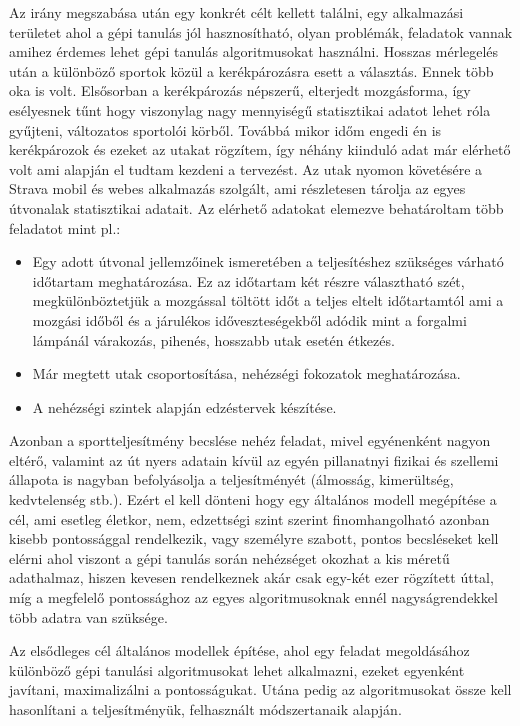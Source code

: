 Az irány megszabása után egy konkrét célt kellett találni, egy alkalmazási területet ahol a gépi tanulás jól hasznosítható, olyan problémák, feladatok vannak amihez érdemes lehet gépi tanulás algoritmusokat használni. Hosszas mérlegelés után a különböző sportok közül a kerékpározásra esett a választás. Ennek több oka is volt. Elsősorban a kerékpározás népszerű, elterjedt mozgásforma, így esélyesnek tűnt hogy viszonylag nagy mennyiségű statisztikai adatot lehet róla gyűjteni, változatos sportolói körből. Továbbá mikor időm engedi én is kerékpározok és ezeket az utakat rögzítem, így néhány kiinduló adat már elérhető volt ami alapján el tudtam kezdeni a tervezést. Az utak nyomon követésére a Strava mobil és webes alkalmazás szolgált, ami részletesen tárolja az egyes útvonalak statisztikai adatait. Az elérhető adatokat elemezve behatároltam több feladatot mint pl.:
\begin{itemize}
	\item Egy adott útvonal jellemzőinek ismeretében a teljesítéshez szükséges várható időtartam meghatározása. Ez az időtartam két részre választható szét, megkülönböztetjük a mozgással töltött időt a teljes eltelt időtartamtól ami a mozgási időből és a járulékos időveszteségekből adódik mint a forgalmi lámpánál várakozás, pihenés, hosszabb utak esetén étkezés.
	\item Már megtett utak csoportosítása, nehézségi fokozatok meghatározása.
	\item A nehézségi szintek alapján edzéstervek készítése.
\end{itemize}

Azonban a sportteljesítmény becslése nehéz feladat, mivel egyénenként nagyon eltérő, valamint az út nyers adatain kívül az egyén pillanatnyi fizikai és szellemi állapota is nagyban befolyásolja a teljesítményét (álmosság, kimerültség, kedvtelenség stb.). Ezért el kell dönteni hogy egy általános modell megépítése a cél, ami esetleg életkor, nem, edzettségi szint szerint finomhangolható azonban kisebb pontossággal rendelkezik, vagy személyre szabott, pontos becsléseket kell elérni ahol viszont a gépi tanulás során nehézséget okozhat a kis méretű adathalmaz, hiszen kevesen rendelkeznek akár csak egy-két ezer rögzített úttal, míg a megfelelő pontossághoz az egyes algoritmusoknak ennél nagyságrendekkel több adatra van szüksége.
 
Az elsődleges cél általános modellek építése, ahol egy feladat megoldásához különböző gépi tanulási algoritmusokat lehet alkalmazni, ezeket egyenként javítani, maximalizálni a pontosságukat. Utána pedig az algoritmusokat össze kell hasonlítani a teljesítményük, felhasznált módszertanaik alapján.


